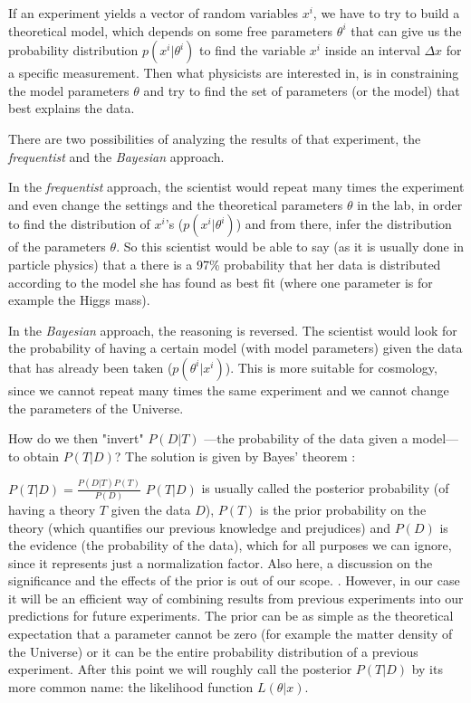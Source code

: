 If an experiment yields a vector of random variables $x^i$, 
we have to
try to build a theoretical model, which depends on some free parameters $\theta^i$ 
that can give us the probability distribution $p(x^i | \theta^i)$ to find the variable $x^i$ 
inside an interval $\Delta x$ for a specific measurement.
Then what physicists are interested in, is in constraining the model parameters $\theta$ and try to find
the set of parameters (or the model) that best explains the data.

There are two possibilities of analyzing the results of that experiment, the \emph{frequentist}
and the \emph{Bayesian} approach.

In the \emph{frequentist} approach, the scientist would repeat many times the experiment and even change
the settings and the theoretical parameters $\theta$ in the lab, in order to find the distribution
of $x^i$'s ($p(x^i | \theta^i)$) and from there, infer the distribution of the parameters $\theta$. So this scientist would
be able to say (as it is usually done in particle physics) that a there is a 97\% probability that her 
data is distributed according to the model she has found as best fit (where one parameter is for example the Higgs mass).

In the \emph{Bayesian} approach, the reasoning is reversed. The scientist would look for the probability
of having a certain model (with model parameters) given the data that has already been taken ($p(\theta^i | x^i)$). This is more suitable
for cosmology, since we cannot repeat many times the same experiment and we cannot change
the parameters of the Universe.

How do we then "invert" $P(D | T)$ ---the probability of the data given a model--- to obtain $P(T | D)$? The solution is given by 
Bayes' theorem \cite{Bayes, Dodelson, Luca, many}:

\beeq$ \label{eq:BayesTheorem}
P(T | D) = \frac{P(D | T) P(T)}{P(D)}$
$P(T | D)$ is usually called the posterior probability (of having a theory $T$ given the data $D$), 
$P(T)$ is the prior probability on the theory (which quantifies our previous knowledge and prejudices)
and $P(D)$ is the evidence (the probability of the data), which for all purposes we can ignore, since it
represents just a normalization factor.
Also here, a discussion on the significance and the effects of the prior is out of our scope. \cite{cite Amendola, Dodelson, Gregory, reviews}. However, in our case it will be an efficient way of combining results from previous
experiments into our predictions for future experiments. The prior can be as simple as the theoretical expectation
that a parameter cannot be zero (for example the matter density of the Universe) or it can be the entire
probability distribution of a previous experiment.
After this point we will roughly call the posterior $P(T | D)$ by its more common name: the likelihood function
$L(\theta | x)$.

